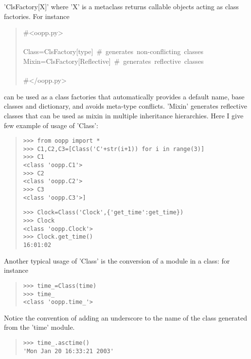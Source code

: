 \documentclass[10pt,english]{article}
\begin{document}
'ClsFactory[X]' where 'X' is a metaclass returns callable objects acting as
class factories. For instance
\begin{quote}
\begin{ttfamily}\begin{flushleft}
\mbox{{\#}<oopp.py>}\\
\mbox{}\\
\mbox{Class=ClsFactory[type]~{\#}~generates~non-conflicting~classes}\\
\mbox{Mixin=ClsFactory[Reflective]~{\#}~generates~reflective~classes}\\
\mbox{~~}\\
\mbox{{\#}</oopp.py>}
\end{flushleft}\end{ttfamily}
\end{quote}

can be used as a class factories that automatically provides a default name,
base classes and dictionary, and avoids meta-type conflicts.
'Mixin' generates reflective classes that can be used as mixin in multiple
inheritance hierarchies. Here I give few example of usage of 'Class':
\begin{quote}
\begin{verbatim}>>> from oopp import *
>>> C1,C2,C3=[Class('C'+str(i+1)) for i in range(3)]
>>> C1
<class 'oopp.C1'>
>>> C2
<class 'oopp.C2'>
>>> C3
<class 'oopp.C3'>]\end{verbatim}
\begin{verbatim}>>> Clock=Class('Clock',{'get_time':get_time})
>>> Clock
<class 'oopp.Clock'>
>>> Clock.get_time()
16:01:02\end{verbatim}
\end{quote}

Another typical usage of 'Class' is the conversion of a module in a class: 
for instance
\begin{quote}
\begin{verbatim}>>> time_=Class(time)
>>> time_
<class 'oopp.time_'>\end{verbatim}
\end{quote}

Notice the convention of adding an underscore to the name of the class 
generated from the 'time' module.
\begin{quote}
\begin{verbatim}>>> time_.asctime()
'Mon Jan 20 16:33:21 2003'\end{verbatim}
\end{quote}
\end{document}
